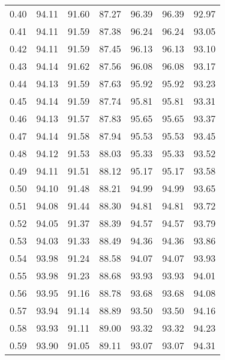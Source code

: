 \begin{tabular}{|c|c|c|c|c|c|c|}
      0.40 &     94.11 &     91.60 &      87.27 &   96.39 &      96.39 &         92.97 \\
      0.41 &     94.11 &     91.59 &      87.38 &   96.24 &      96.24 &         93.05 \\
      0.42 &     94.11 &     91.59 &      87.45 &   96.13 &      96.13 &         93.10 \\
      0.43 &     94.14 &     91.62 &      87.56 &   96.08 &      96.08 &         93.17 \\
      0.44 &     94.13 &     91.59 &      87.63 &   95.92 &      95.92 &         93.23 \\
      0.45 &     94.14 &     91.59 &      87.74 &   95.81 &      95.81 &         93.31 \\
      0.46 &     94.13 &     91.57 &      87.83 &   95.65 &      95.65 &         93.37 \\
      0.47 &     94.14 &     91.58 &      87.94 &   95.53 &      95.53 &         93.45 \\
      0.48 &     94.12 &     91.53 &      88.03 &   95.33 &      95.33 &         93.52 \\
      0.49 &     94.11 &     91.51 &      88.12 &   95.17 &      95.17 &         93.58 \\
      0.50 &     94.10 &     91.48 &      88.21 &   94.99 &      94.99 &         93.65 \\
      0.51 &     94.08 &     91.44 &      88.30 &   94.81 &      94.81 &         93.72 \\
      0.52 &     94.05 &     91.37 &      88.39 &   94.57 &      94.57 &         93.79 \\
      0.53 &     94.03 &     91.33 &      88.49 &   94.36 &      94.36 &         93.86 \\
      0.54 &     93.98 &     91.24 &      88.58 &   94.07 &      94.07 &         93.93 \\
      0.55 &     93.98 &     91.23 &      88.68 &   93.93 &      93.93 &         94.01 \\
      0.56 &     93.95 &     91.16 &      88.78 &   93.68 &      93.68 &         94.08 \\
      0.57 &     93.94 &     91.14 &      88.89 &   93.50 &      93.50 &         94.16 \\
      0.58 &     93.93 &     91.11 &      89.00 &   93.32 &      93.32 &         94.23 \\
      0.59 &     93.90 &     91.05 &      89.11 &   93.07 &      93.07 &         94.31 \\

\end{tabular}
